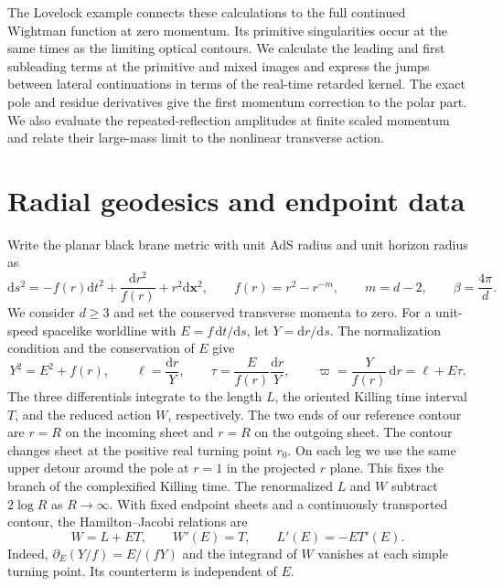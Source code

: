 \documentclass[11pt,a4paper]{article}
\newcommand{\dd}{\mathrm{d}}
\begin{document}
The Lovelock example connects these calculations to the full continued Wightman function at zero momentum. Its primitive singularities occur at the same times as the limiting optical contours. We calculate the leading and first subleading terms at the primitive and mixed images and express the jumps between lateral continuations in terms of the real-time retarded kernel. The exact pole and residue derivatives give the first momentum correction to the polar part. We also evaluate the repeated-reflection amplitudes at finite scaled momentum and relate their large-mass limit to the nonlinear transverse action.

\section{Radial geodesics and endpoint data}
\label{sec:radial}

Write the planar black brane metric with unit AdS radius and unit horizon radius as
\begin{equation}
 \dd s^2=-f(r)\dd t^2+\frac{\dd r^2}{f(r)}+r^2\dd\boldsymbol{x}^2,
 \qquad f(r)=r^2-r^{-m},\qquad m=d-2,\qquad \beta=\frac{4\pi}{d}.
 \label{eq:metric}
\end{equation}
We consider \(d\geq 3\) and set the conserved transverse momenta to zero. For a unit-speed spacelike worldline with \(E=f\,\dd t/\dd s\), let \(Y=\dd r/\dd s\). The normalization condition and the conservation of \(E\) give
\begin{equation}
 Y^2=E^2+f(r),\qquad
 \ell=\frac{\dd r}{Y},\qquad
 \tau=\frac{E}{f(r)}\frac{\dd r}{Y},
 \qquad \varpi=\frac{Y}{f(r)}\,\dd r=\ell+E\tau .
 \label{eq:forms}
\end{equation}
The three differentials integrate to the length \(L\), the oriented Killing time interval \(T\), and the reduced action \(W\), respectively. The two ends of our reference contour are \(r=R\) on the incoming sheet and \(r=R\) on the outgoing sheet. The contour changes sheet at the positive real turning point \(r_0\). On each leg we use the same upper detour around the pole at \(r=1\) in the projected \(r\) plane. This fixes the branch of the complexified Killing time. The renormalized \(L\) and \(W\) subtract \(2\log R\) as \(R\to\infty\). With fixed endpoint sheets and a continuously transported contour, the Hamilton--Jacobi relations are
\begin{equation}
 W=L+ET,\qquad W'(E)=T,\qquad L'(E)=-E T'(E).
 \label{eq:hj}
\end{equation}
Indeed, \(\partial_E(Y/f)=E/(fY)\) and the integrand of \(W\) vanishes at each simple turning point. Its counterterm is independent of \(E\).
\end{document}
